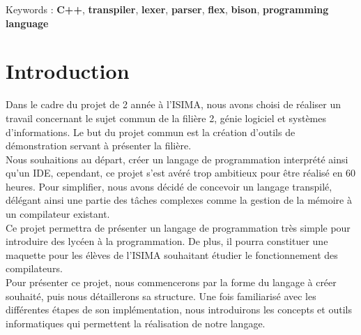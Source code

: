 \documentclass[a4paper]{article}%
\begin{document}
\noindent
Keywords : \textbf{C++}, \textbf{transpiler}, \textbf{lexer}, \textbf{parser},
\textbf{flex}, \textbf{bison}, \textbf{programming language}

\clearpage{}

\clearpage
\section*{Introduction}
\large
Dans le cadre du projet de 2 année à l'ISIMA, nous avons choisi de
réaliser un travail concernant le sujet commun de la filière 2, génie logiciel
et systèmes d'informations. Le but du projet commun est la création d'outils de
démonstration servant à présenter la filière.\\

Nous souhaitions au départ, créer un langage de programmation interprété ainsi
qu'un IDE, cependant, ce projet s'est avéré trop ambitieux pour être réalisé en
60 heures. Pour simplifier, nous avons décidé de concevoir un langage transpilé,
délégant ainsi une partie des tâches complexes comme la gestion de la mémoire à
un compilateur existant.\\

Ce projet permettra de présenter un langage de programmation très simple pour
introduire des lycéen à la programmation. De plus, il pourra constituer une
maquette pour les élèves de l'ISIMA souhaitant étudier le fonctionnement des
compilateurs.\\

Pour présenter ce projet, nous commencerons par la forme du langage à créer
souhaité, puis nous détaillerons sa structure. Une fois familiarisé avec les
différentes étapes de son implémentation,  nous introduirons les concepts et
outils informatiques qui permettent la réalisation de notre langage.\\

\normalsize
\clearpage{}


\end{document}
